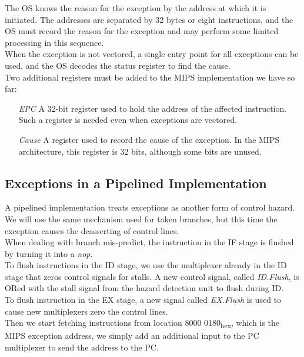 \documentclass[12pt]{article}
\theoremstyle{definition}
\begin{document}
  The OS knows the reason for the exception by the address at which it is initiated.
  The addresses are separated by 32 bytes or eight instructions, and the OS must record the reason for the exception and may perform some limited processing in this sequence. \\
  When the exception is not vectored, a single entry point for all exceptions can be used, and the OS decodes the status register to find the cause. \\

  Two additional registers must be added to the MIPS implementation we have so far:
  \begin{itemize}
    \item[\emph{EPC}] A 32-bit register used to hold the address of the affected instruction. \\
    Such a register is needed even when exceptions are vectored.
    \item[\emph{Cause}] A register used to record the cause of the exception.
    In the MIPS architecture, this register is 32 bits, although some bits are unused.
  \end{itemize}

  \subsection{Exceptions in a Pipelined Implementation}
  A pipelined implementation treats exceptions as another form of control hazard.
  We will use the same mechanism used for taken branches, but this time the exception causes the deasserting of control lines. \\

  When dealing with branch mis-predict, the instruction in the IF stage is flushed by turning it into a \emph{nop}. \\
  To flush instructions in the ID stage, we use the multiplexer already in the ID stage that zeros control signals for stalls.
  A new control signal, called \emph{ID.Flush}, is ORed with the stall signal from the hazard detection unit to flush during ID. \\
  To flush instruction in the EX stage, a new signal called \emph{EX.Flush} is used to cause new multiplexers zero the control lines. \\
  Then we start fetching instructions from location 8000 0180\textsubscript{hex}, which is the MIPS exception address, we simply add an additional input to the PC multiplexer to send the address to the PC.
\end{document}
